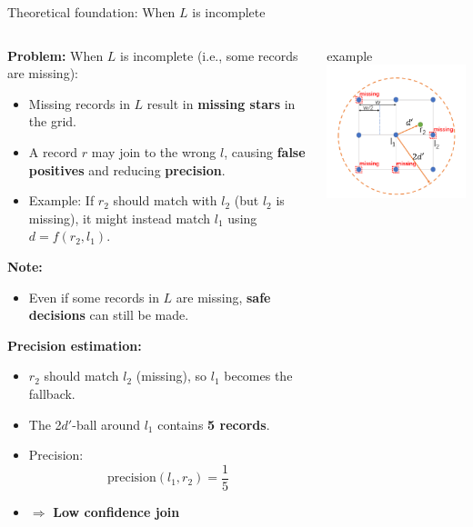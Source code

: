\documentclass[8pt]{beamer} %
\begin{document}
\begin{frame}{Theoretical foundation: When $L$ is incomplete}
	\begin{columns}
		\begin{column}{0.53\textwidth}
			\textbf{Problem:} When $L$ is incomplete (i.e., some records are missing):
			\begin{itemize}
				\item Missing records in $L$ result in \textbf{missing stars} in the grid.
				\item A record $r$ may join to the wrong $l$, causing \textbf{false positives} and reducing \textbf{precision}.
				\item Example: If $r_2$ should match with $l_2$ (but $l_2$ is missing), it might instead match $l_1$ using $d = f(r_2, l_1)$.
			\end{itemize}
			

			\textbf{Note:}
			\begin{itemize}
				\item Even if some records in $L$ are missing, \textbf{safe decisions} can still be made.
			\end{itemize}
			

			\textbf{Precision estimation:}
			\begin{itemize}
				\item $r_2$ should match $l_2$ (missing), so $l_1$ becomes the fallback.
				\item The 2$d'$-ball around $l_1$ contains \textbf{5 records}.
				\item Precision:
				$$
				\text{precision}(l_1, r_2) = \frac{1}{5}
				$$
				\item $\Rightarrow$ \textbf{Low confidence join}
			\end{itemize}
		\end{column}
		
		\begin{column}{0.43\textwidth}
			\begin{beamercolorbox}[rounded=true, shadow=true, leftskip=1em, rightskip=1em]{example}		
				\centering
				\includegraphics[width=0.7\linewidth]{img/Pasted image 20250331211607.png}
			

\end{beamercolorbox}
\end{column}
\end{columns}
\end{frame}
\end{document}
